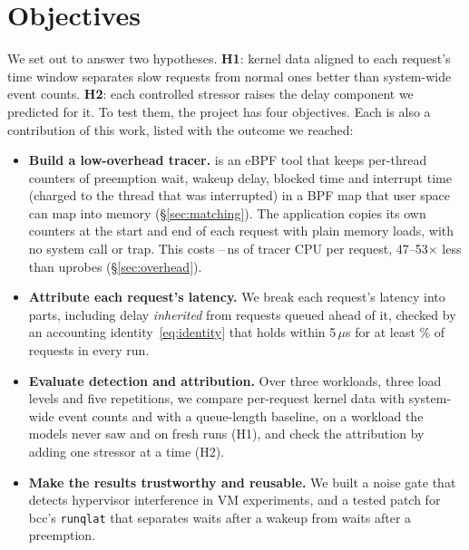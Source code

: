 \section{Objectives}
\label{sec:objectives}
We set out to answer two hypotheses. \textbf{H1}: kernel data aligned to
each request's time window separates slow requests from normal ones better
than system-wide event counts. \textbf{H2}: each controlled stressor raises
the delay component we predicted for it. To test them, the project has four
objectives. Each is also a contribution of this work, listed with the
outcome we reached:
\begin{itemize}
\item \textbf{Build a low-overhead tracer.} \sys{} is an eBPF tool that keeps per-thread counters of preemption
wait, wakeup delay, blocked time and interrupt time (charged to the thread
that was interrupted) in a BPF map that user space can map into memory
(\S\ref{sec:matching}). The application copies its own counters at the start and end of each request
with plain memory loads, with no system call or trap. This costs
\ovNsKvShm--\ovNsCpuShm{}\,ns of tracer CPU per request, 47--53$\times$ less
than uprobes (\S\ref{sec:overhead}).
\item \textbf{Attribute each request's latency.} We break each request's
latency into parts, including delay
\emph{inherited} from requests queued ahead of it, checked by an accounting
identity~\eqref{eq:identity} that holds within 5\,$\mu$s for at least
\valWithin\% of requests in every run.
\item \textbf{Evaluate detection and attribution.} Over three workloads,
three load levels and five repetitions, we compare per-request kernel data with system-wide event
counts and with a queue-length baseline, on a workload the models never saw
and on fresh runs (H1), and check the attribution by adding one stressor
at a time (H2).
\item \textbf{Make the results trustworthy and reusable.} We built a noise gate that detects hypervisor interference in
VM experiments, and a tested patch for bcc's \texttt{runqlat} that separates
waits after a wakeup from waits after a preemption.
\end{itemize}
